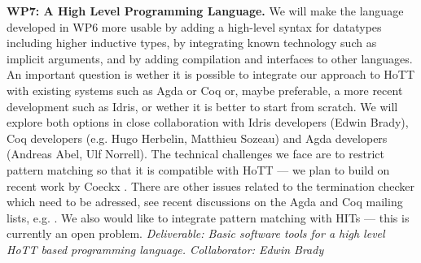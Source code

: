 \documentclass[a4paper,11pt]{article}
\begin{document}


{\bf WP7: A High Level Programming Language.} We will make the
language developed in WP6 more usable by adding a high-level syntax
for datatypes including higher inductive types, by integrating known
technology such as implicit arguments, and by adding compilation and
interfaces to other languages. An important question is wether it is
possible to integrate our approach to HoTT with existing systems such
as Agda or Coq or, maybe preferable,  a more recent development such as Idris, or wether it is better to start from scratch. 
We
will explore both options in close collaboration with Idris developers (Edwin Brady), Coq developers
(e.g. Hugo Herbelin, Matthieu Sozeau) and Agda developers (Andreas
Abel, Ulf Norrell). The technical challenges we face are to restrict pattern matching so
that it is compatible with HoTT --- we plan to build on recent work
by Coeckx \cite{coeckx-without-k}. There are other issues
related to the termination checker which need to be adressed, 
see recent discussions on the Agda and Coq mailing lists, e.g. \cite{agda-issue}.
We also would like to integrate pattern
matching with HITs --- this is currently an open problem. 
{\em Deliverable: Basic software tools for a high level HoTT based programming language. Collaborator: Edwin Brady}



\end{document}
